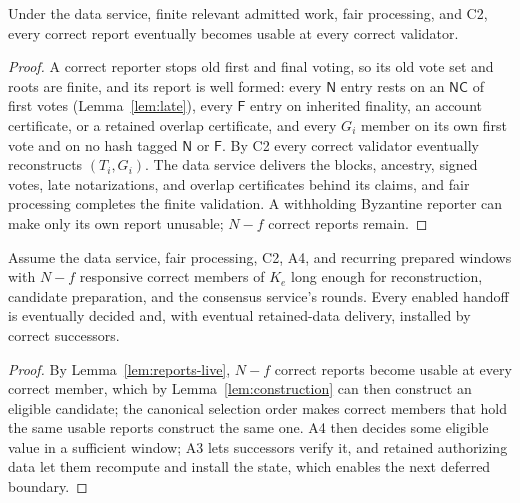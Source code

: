 \documentclass[conference]{IEEEtran}
\newcommand{\NC}{\mathsf{NC}}
\newcommand{\tagN}{\mathsf{N}}
\newcommand{\tagF}{\mathsf{F}}
\begin{document}
\begin{lemma}
\label{lem:reports-live}
Under the data service, finite relevant admitted work, fair processing, and C2, every correct report eventually becomes usable at every correct validator.
\end{lemma}
\begin{proof}
A correct reporter stops old first and final voting, so its old vote set and roots are finite, and its report is well formed: every $\tagN$ entry rests on an $\NC$ of first votes (Lemma~\ref{lem:late}), every $\tagF$ entry on inherited finality, an account certificate, or a retained overlap certificate, and every $G_i$ member on its own first vote and on no hash tagged $\tagN$ or $\tagF$. By C2 every correct validator eventually reconstructs $(T_i,G_i)$. The data service delivers the blocks, ancestry, signed votes, late notarizations, and overlap certificates behind its claims, and fair processing completes the finite validation. A withholding Byzantine reporter can make only its own report unusable; $N-f$ correct reports remain.
\end{proof}

\begin{theorem}
\label{thm:handoff-live}
Assume the data service, fair processing, C2, A4, and recurring prepared windows with $N-f$ responsive correct members of $K_e$ long enough for reconstruction, candidate preparation, and the consensus service's rounds. Every enabled handoff is eventually decided and, with eventual retained-data delivery, installed by correct successors.
\end{theorem}
\begin{proof}
By Lemma~\ref{lem:reports-live}, $N-f$ correct reports become usable at every correct member, which by Lemma~\ref{lem:construction} can then construct an eligible candidate; the canonical selection order makes correct members that hold the same usable reports construct the same one. A4 then decides some eligible value in a sufficient window; A3 lets successors verify it, and retained authorizing data let them recompute and install the state, which enables the next deferred boundary.
\end{proof}
\end{document}
